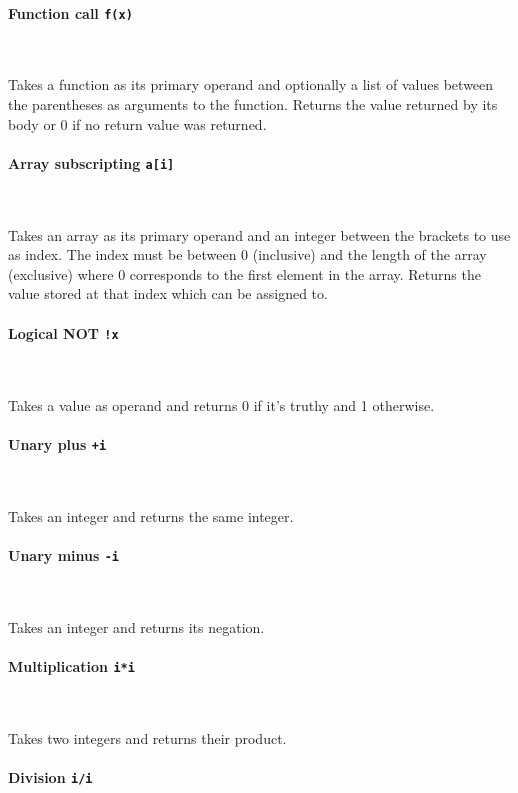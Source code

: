 \paragraph{Function call \quad \texttt{f(x)}} \

Takes a function as its primary operand and optionally a list of values between the parentheses as arguments to the function. Returns the value returned by its body or 0 if no return value was returned.

\paragraph{Array subscripting \quad \texttt{a[i]}} \

Takes an array as its primary operand and an integer between the brackets to use as index. The index must be between 0 (inclusive) and the length of the array (exclusive) where 0 corresponds to the first element in the array. Returns the value stored at that index which can be assigned to.

\paragraph{Logical NOT \quad \texttt{!x}} \

Takes a value as operand and returns 0 if it's truthy and 1 otherwise.

\paragraph{Unary plus \quad \texttt{+i}} \

Takes an integer and returns the same integer.

\paragraph{Unary minus \quad \texttt{-i}} \

Takes an integer and returns its negation.

\paragraph{Multiplication \quad \texttt{i*i}} \

Takes two integers and returns their product.

\paragraph{Division \quad \texttt{i/i}} \

